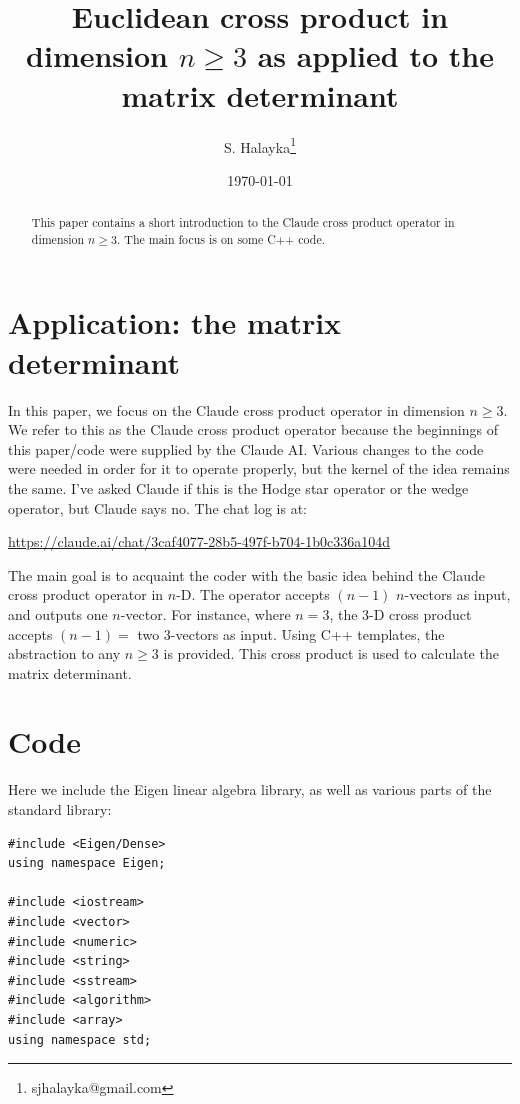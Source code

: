 \documentclass[12pt]{article}
\title{Euclidean cross product in dimension $n \ge 3$ as applied to the matrix determinant}
\author{S. Halayka\footnote{sjhalayka@gmail.com}}
\date{\today\;\currenttime}
\begin{document}
 
\maketitle

\begin{abstract}
This paper contains a short introduction to the Claude cross product operator in dimension $n \ge 3$.
The main focus is on some C++ code.
\end{abstract}




\section{Application: the matrix determinant}

In this paper, we focus on the Claude cross product operator in dimension $n \ge 3$.
We refer to this as the Claude cross product operator because the beginnings of this paper/code were supplied by the Claude AI.
Various changes to the code were needed in order for it to operate properly, but the kernel of the idea remains the same.
I've asked Claude if this is the Hodge star operator or the wedge operator, but Claude says no.
The chat log is at:

\url{https://claude.ai/chat/3caf4077-28b5-497f-b704-1b0c336a104d}

The main goal is to acquaint the coder with the basic idea behind the Claude cross product operator in $n$-D. 
The operator accepts $(n - 1)$ $n$-vectors as input, and outputs one $n$-vector.
For instance, where $n = 3$, the $3$-D cross product accepts $(n - 1) = $ two $3$-vectors as input.
Using C++ templates, the abstraction to any $n \ge 3$ is provided.
This cross product is used to calculate the matrix determinant.







\section{Code}

Here we include the Eigen linear algebra library, as well as various parts of the standard library:
\begin{lstlisting}
#include <Eigen/Dense>
using namespace Eigen;

#include <iostream>
#include <vector>
#include <numeric>
#include <string>
#include <sstream>
#include <algorithm>
#include <array>
using namespace std;
\end{lstlisting}
\end{document}
